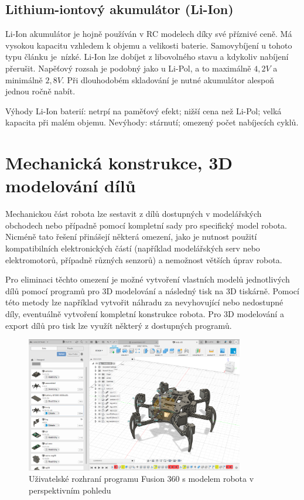 \subsection*{Lithium-iontový akumulátor (Li-Ion)}
Li-Ion \cite{batLiIon} akumulátor je hojně používán v RC modelech díky své příznivé ceně. Má vysokou kapacitu vzhledem k objemu a velikosti baterie. Samovybíjení u tohoto typu článku je~nízké. Li-Ion lze dobíjet z libovolného stavu a kdykoliv nabíjení přerušit. Napěťový rozsah je podobný jako u Li-Pol, a to maximálně $4,2V$ a minimálně $2,8V$. Při dlouhodobém skladování je nutné akumulátor alespoň jednou ročně nabít.

Výhody Li-Ion baterií: netrpí na paměťový efekt; nižší cena než Li-Pol; velká kapacita při malém objemu. Nevýhody: stárnutí; omezený počet nabíjecích cyklů.



\section{Mechanická konstrukce, 3D modelování dílů}
Mechanickou část robota lze sestavit z dílů dostupných v modelářských obchodech nebo případně pomocí kompletní sady pro specifický model robota. Nicméně tato řešení přinášejí některá omezení, jako je nutnost použití kompatibilních elektronických částí (například modelářských serv nebo elektromotorů, případně různých senzorů) a nemožnost větších úprav robota.

Pro eliminaci těchto omezení je možné vytvoření vlastních modelů jednotlivých dílů pomocí programů pro 3D modelování a následný tisk na 3D tiskárně. Pomocí této metody lze například vytvořit náhradu za nevyhovující nebo nedostupné díly, eventuálně vytvoření kompletní konstrukce robota. Pro 3D modelování a export dílů pro tisk lze využít některý z dostupných programů.

\begin{figure}[hbt]
	\centering
	\includegraphics[width=0.85\textwidth]{obrazky-figures/fusion.png}
	\caption{Uživatelské rozhraní programu Fusion 360 s modelem robota v perspektivním pohledu}
    \label{fusionp}
\end{figure}

